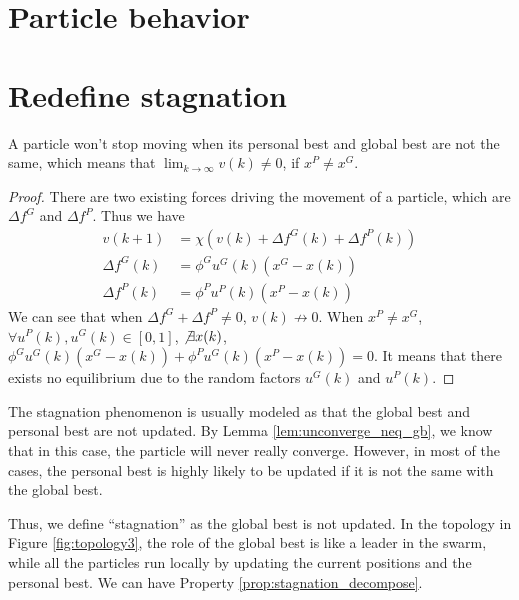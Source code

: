 \section{Particle behavior}
\label{sec:particle_behavior}

\section{Redefine stagnation}
\label{sec:redefine_stagnation}

\begin{lemma}
\label{lem:unconverge_neq_gb}
A particle won't stop moving when its personal best and global best are not the same, 
which means that 
$ \lim_{k \rightarrow \infty} v(k) \neq 0 $, if $ x^{P} \neq x^{G} $.
\begin{proof} 
There are two existing forces driving the movement of a particle, which are $ \Delta f^{G} $ and $ \Delta f^{P} $.
Thus we have
\begin{equation}
\begin{array}{lcl}
v(k+1) & = \chi ( v(k) + \Delta f^{G} (k) + \Delta f^{P} (k) ) \\
\Delta f^{G} (k) & = \phi^{G} u^{G} (k) (x^{G} - x(k)) \\
\Delta f^{P} (k) & = \phi^{P} u^{P} (k) (x^{P} - x(k)) 
\end{array}
\end{equation}
We can see that when $ \Delta f^{G} + \Delta f^{P} \neq 0 $, $ v(k)  \not \rightarrow 0 $.
When $ x^{P} \neq x^{G} $, $ \forall u^{P}(k), u^{G}(k) \in [0, 1] $, $ \not \exists x(k) $, $ \phi^{G} u^{G} (k) (x^{G} - x(k)) + \phi^{P} u^{G} (k) (x^{P} - x(k)) = 0 $.
It means that there exists no equilibrium due to the random factors $ u^{G} (k) $ and $ u^{P} (k) $. 
\end{proof}
\end{lemma}

The stagnation phenomenon is usually modeled as that the global best and personal best are not updated.
By Lemma \ref{lem:unconverge_neq_gb}, we know that in this case, the particle will never really converge.
However, in most of the cases, the personal best is highly likely to be updated if it is not the same with the global best.

Thus, we define ``stagnation'' as the global best is not updated.
In the topology in Figure \ref{fig:topology3}, the role of the global best is like a leader in the swarm, while all the particles run locally by updating the current positions and the personal best.
We can have Property \ref{prop:stagnation_decompose}.

